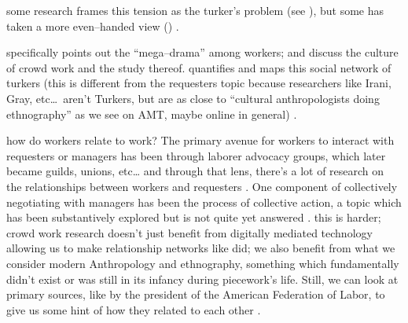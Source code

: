 \documentclass[trackingWork]{subfiles}
\begin{document}
some research frames this tension as the turker's problem
(see \citeauthor{MaliciousCrowdworkersGadiraju}),
but some has taken a more even--handed view (\citeauthor{takingAHITMcInnis})
\cite{turkopticon,dynamo,MaliciousCrowdworkersGadiraju,takingAHITMcInnis}.

\topic{}
\citeauthor{dynamo} specifically points out the ``mega--drama'' among workers;
\citeauthor{irani2015cultural} and \citeauthor{storiesIraniSilberman} discuss
the culture of crowd work and the study thereof.
\citeauthor{crowdcollab} quantifies and maps this social network of turkers
(this is different from the requesters topic because
researchers like Irani, Gray, etc\dots~aren't Turkers, but are as close to
``cultural anthropologists doing ethnography'' as we see on AMT, maybe online in general)
\cite{dynamo,irani2015cultural,storiesIraniSilberman,crowdcollab}.


\subsubsubsection{\pieceworkpers}
  how do workers relate to work?
          The primary avenue for workers to interact with requesters or managers has been through
        laborer advocacy groups, which later became guilds, unions, etc\dots
        and through that lens, there's a lot of research on
        the relationships between workers and requesters
        \cite{levi2009union,ahlquist2013interest,
              mccallum2013global,jacoby1983union}.
        One component of collectively negotiating with managers has been the process
        of collective action, a topic which has been substantively explored
        but is not quite yet answered
        \cite{russell1982collective,olsonlogic}.
  this is harder; crowd work research doesn't just benefit from
        digitally mediated technology allowing us to make
        relationship networks like \citeauthor{crowdcollab} did;
        we also benefit from what we consider modern Anthropology and ethnography,
        something which fundamentally didn't exist or was still in its infancy during piecework's life.
        Still, we can look at primary sources, like \cite{american1921problem} by
        the president of the American Federation of Labor,
        to give us some hint of how they related to each other
        \cite{american1921problem,crowdcollab}.
\end{document}

